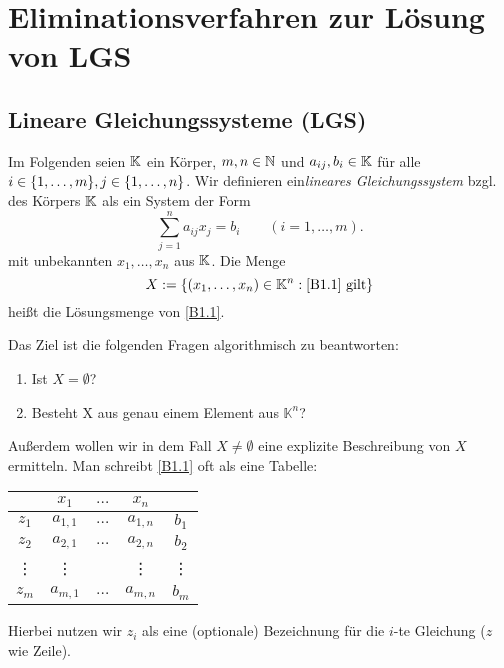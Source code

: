 

\section{Eliminationsverfahren zur Lösung von LGS}

\subsection{Lineare Gleichungssysteme (LGS)}

Im Folgenden seien $ \mathbb K $ ein Körper, $ m,n \in \mathbb N $ und $ a_{ij}, b_i \in \mathbb K $ für alle $ i \in \{ 1,\ldots,m \}, j \in \{ 1,\ldots,n \} $. Wir definieren ein\emph{lineares Gleichungssystem} bzgl. des Körpers $\mathbb K$ als ein System der Form
\begin{equation}
	\sum_{j=1}^{n} a_{ij} x_j = b_i \qquad  (i=1,\ldots,m). 
	\label{B1.1}
\end{equation}
mit unbekannten $ x_1, \ldots, x_n $ aus $ \mathbb K $. Die Menge
\begin{equation}
	X := \{(x_1, \ldots, x_n) \in \mathbb K^n : \text{\eqref{B1.1} gilt} \}
	\label{B1.2}
\end{equation}
heißt die Lösungsmenge von \eqref{B1.1}.

Das Ziel ist die folgenden Fragen algorithmisch zu beantworten:
\begin{enumerate}
	\item
		Ist $ X = \emptyset $?
	\item
		Besteht X aus genau einem Element aus $ \mathbb{K}^n $?
\end{enumerate}
Außerdem wollen wir in dem Fall $ X \neq \emptyset $ eine explizite Beschreibung von $ X $ ermitteln. Man schreibt \eqref{B1.1} oft als eine Tabelle:
\begin{center}
\begin{tabular}{c|ccc|c}
	& $ x_1 $ & $ \ldots $ & $ x_n $ & \\
	\hline
	$ z_1 $ & $ a_{1,1} $ & $ \ldots $ & $ a_{1,n} $ & $ b_1 $ \\
	$ z_2 $ & $ a_{2,1} $ & $ \ldots $ & $ a_{2,n} $ & $ b_2 $ \\
	\vdots & \vdots &  & \vdots & \vdots \\
	$ z_m $ & $ a_{m,1} $ & $ \ldots $ & $ a_{m,n} $ & $ b_m $ \\
	\hline
\end{tabular}
\end{center}
Hierbei nutzen wir $ z_i $ als eine (optionale) Bezeichnung für die $ i $-te Gleichung ($ z $ wie Zeile). 

